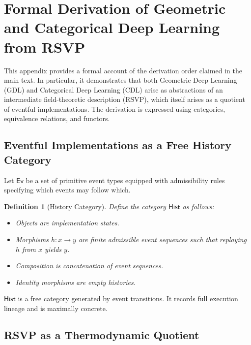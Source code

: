 \documentclass[11pt]{article}
\newtheorem{definition}{Definition}
\begin{document}
\appendix
\section{Formal Derivation of Geometric and Categorical Deep Learning from RSVP}

This appendix provides a formal account of the derivation order claimed in the
main text. In particular, it demonstrates that both Geometric Deep Learning (GDL)
and Categorical Deep Learning (CDL) arise as abstractions of an intermediate
field-theoretic description (RSVP), which itself arises as a quotient of
eventful implementations. The derivation is expressed using categories,
equivalence relations, and functors.

\subsection{Eventful Implementations as a Free History Category}

Let $\mathsf{Ev}$ be a set of primitive event types equipped with admissibility
rules specifying which events may follow which.

\begin{definition}[History Category]
Define the category $\mathsf{Hist}$ as follows:
\begin{itemize}
\item Objects are implementation states.
\item Morphisms $h : x \to y$ are finite admissible event sequences such that
      replaying $h$ from $x$ yields $y$.
\item Composition is concatenation of event sequences.
\item Identity morphisms are empty histories.
\end{itemize}
\end{definition}

$\mathsf{Hist}$ is a free category generated by event transitions. It records
full execution lineage and is maximally concrete.

\subsection{RSVP as a Thermodynamic Quotient}
\end{document}
